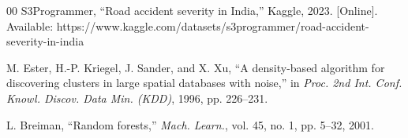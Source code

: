 \documentclass[conference]{IEEEtran}
\begin{document}
\begin{thebibliography}{00}
 S3Programmer, ``Road accident severity in India,'' Kaggle, 2023. [Online]. Available: https://www.kaggle.com/datasets/s3programmer/road-accident-severity-in-india

 M. Ester, H.-P. Kriegel, J. Sander, and X. Xu, ``A density-based algorithm for discovering clusters in large spatial databases with noise,'' in \textit{Proc. 2nd Int. Conf. Knowl. Discov. Data Min. (KDD)}, 1996, pp. 226--231.

 L. Breiman, ``Random forests,'' \textit{Mach. Learn.}, vol. 45, no. 1, pp. 5--32, 2001.

\end{thebibliography}
\end{document}

